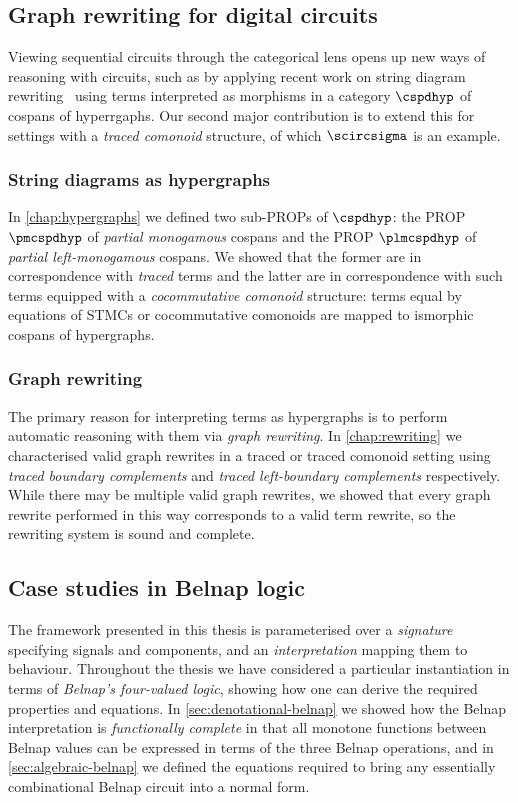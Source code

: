 \subsection{Graph rewriting for digital circuits}

Viewing sequential circuits through the categorical lens opens up new ways of
reasoning with circuits, such as by applying recent work on string diagram
rewriting~\cite{bonchi2022string,bonchi2022stringa} using terms interpreted as
morphisms in a category \(\cspdhyp\) of cospans of hyperrgaphs.
Our second major contribution is to extend this for settings with a
\emph{traced comonoid} structure, of which \(\scircsigma\) is an example.

\subsubsection{String diagrams as hypergraphs}

In \cref{chap:hypergraphs} we defined two sub-PROPs of \(\cspdhyp\):
the PROP \(\pmcspdhyp\) of \emph{partial monogamous} cospans and
the PROP \(\plmcspdhyp\) of \emph{partial left-monogamous} cospans.
We showed that the former are in correspondence with \emph{traced} terms and the
latter are in correspondence with such terms equipped with a
\emph{cocommutative comonoid} structure: terms equal by equations of STMCs or
cocommutative comonoids are mapped to ismorphic cospans of hypergraphs.

\subsubsection{Graph rewriting}

The primary reason for interpreting terms as hypergraphs is to perform automatic
reasoning with them via \emph{graph rewriting}.
In \cref{chap:rewriting} we characterised valid graph rewrites in a traced or
traced comonoid setting using \emph{traced boundary complements} and
\emph{traced left-boundary complements} respectively.
While there may be multiple valid graph rewrites, we showed that every graph
rewrite performed in this way corresponds to a valid term rewrite, so the
rewriting system is sound and complete.

\subsection{Case studies in Belnap logic}

The framework presented in this thesis is parameterised over a
\emph{signature} specifying signals and components, and an
\emph{interpretation} mapping them to behaviour.
Throughout the thesis we have considered a particular instantiation in terms of
\emph{Belnap's four-valued logic}, showing how one can derive the required
properties and equations.
In \cref{sec:denotational-belnap} we showed how the Belnap interpretation is
\emph{functionally complete} in that all monotone functions between Belnap
values can be expressed in terms of the three Belnap operations, and in
\cref{sec:algebraic-belnap} we defined the equations required to bring any
essentially combinational Belnap circuit into a normal form.

